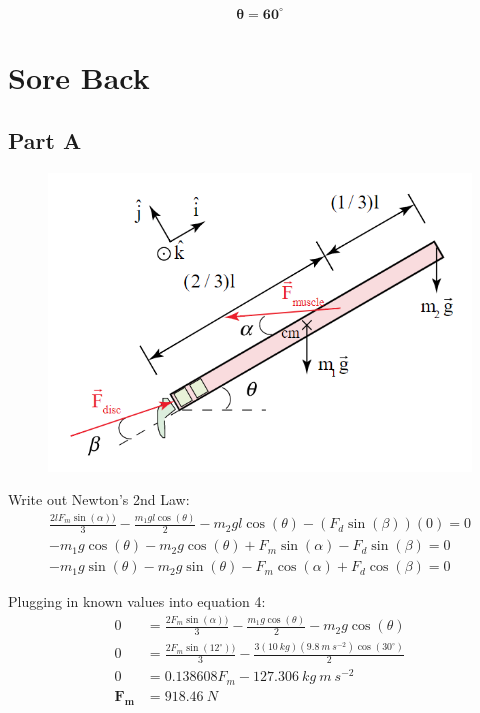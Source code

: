 \documentclass{article}
\begin{document}
$$\bm{\theta=60^{\circ}}$$

\section{Sore Back}

\subsection*{Part A}

\begin{figure}[H]
    \centering
    \includegraphics[scale=0.55]{"Figure 2"}
\end{figure}

Write out Newton's 2nd Law:
\begin{gather}
    \frac{2lF_{m}\sin(\alpha))}{3}-\frac{m_1gl\cos(\theta)}{2}-m_2gl\cos(\theta)-(F_{d}\sin(\beta))(0)=0\\
    -m_1g\cos(\theta)-m_2g\cos(\theta)+F_m\sin(\alpha)-F_d\sin(\beta)=0\\
    -m_1g\sin(\theta)-m_2g\sin(\theta)-F_m\cos(\alpha)+F_d\cos(\beta)=0
\end{gather}

Plugging in known values into equation 4:
\begin{align*}
    0&=\frac{2F_{m}\sin(\alpha))}{3}-\frac{m_1g\cos(\theta)}{2}-m_2g\cos(\theta)\\
    0&=\frac{2F_{m}\sin(12^{\circ}))}{3}-\frac{3(10\ \si{kg})(9.8\ \si{m\
    s^{-2}})\cos(30^{\circ})}{2}\\
    0&=0.138608F_{m}-127.306\ \si{kg\ m\ s^{-2}}\\
    \bm{F_{m}}&\bm{=918.46}\ \si{N}
\end{align*}
\end{document}
